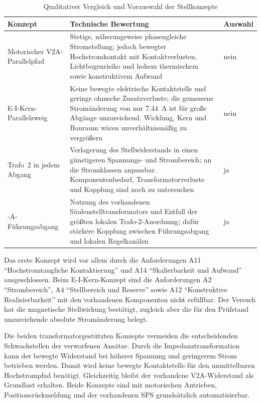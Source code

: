 \begin{table}[H]
    \centering
    \caption{Qualitativer Vergleich und Vorauswahl der Stellkonzepte}
    \label{tab:vergleich_stellkonzepte}
    \small
    \begin{tabular}{p{}p{}p{}}
        \toprule
        Konzept & Technische Bewertung & Auswahl \\
        \midrule
        Motorischer V2A-Parallelpfad &
        Stetige, näherungsweise phasengleiche Stromstellung; jedoch bewegter
        Hochstromkontakt mit Kontaktverlusten, Lichtbogenrisiko und hohem
        thermischem sowie konstruktivem Aufwand &
        nein \\
        \addlinespace
        E-I-Kern-Parallelzweig &
        Keine bewegte elektrische Kontaktstelle und geringe ohmsche
        Zusatzverluste; die gemessene Stromänderung von nur
        \SI{7.44}{\ampere} ist für große Abgänge unzureichend. Wicklung,
        Kern und Bauraum wären unverhältnismäßig zu vergrößern &
        nein \\
        \addlinespace
        Trafo~2 in jedem Abgang &
        Verlagerung des Stellwiderstands in einen günstigeren Spannungs- und
        Strombereich; an die Stromklassen anpassbar. Komponentenbedarf,
        Transformatorverluste und Kopplung sind noch zu untersuchen &
        ja \\
        \addlinespace
        630-A-Führungsabgang &
        Nutzung des vorhandenen Säulenstelltransformators und Entfall der
        größten lokalen Trafo-2-Anordnung; dafür stärkere Kopplung zwischen
        Führungsabgang und lokalen Regelkanälen &
        ja \\
        \bottomrule
    \end{tabular}
\end{table}

Das erste Konzept wird vor allem durch die Anforderungen A11
``Hochstromtaugliche Kontaktierung'' und A14 ``Skalierbarkeit und Aufwand''
ausgeschlossen. Beim E-I-Kern-Konzept sind die Anforderungen A2
``Strombereich'', A4 ``Stellbereich und Reserve'' sowie A12
``Konstruktive Realisierbarkeit'' mit den vorhandenen Komponenten nicht
erfüllbar. Der Versuch hat die magnetische Stellwirkung bestätigt, zugleich
aber die für den Prüfstand unzureichende absolute Stromänderung belegt.

Die beiden transformatorgestützten Konzepte vermeiden die entscheidenden
Schwachstellen der verworfenen Ansätze. Durch die Impedanztransformation kann
der bewegte Widerstand bei höherer Spannung und geringerem Strom betrieben
werden. Damit wird keine bewegte Kontaktstelle für den unmittelbaren
Hochstrompfad benötigt. Gleichzeitig bleibt der vorhandene V2A-Widerstand als
Grundlast erhalten. Beide Konzepte sind mit motorischen Antrieben,
Positionsrückmeldung und der vorhandenen SPS grundsätzlich automatisierbar.


